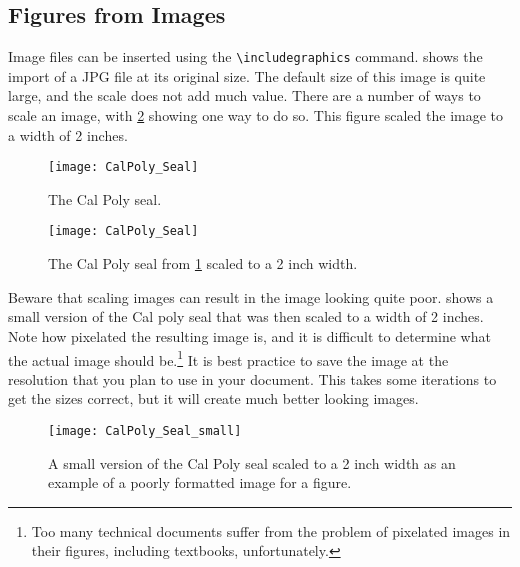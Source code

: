 \subsection{Figures from Images} \label{sec:FiguresFromImages}
    Image files can be inserted using the \lstinline|\includegraphics| command.
     shows the import of a JPG file at its original size.
    The default size of this image is quite large, and the scale does not add much value.
    There are a number of ways to scale an image, with \cref{fig:CalPolySeal_small} showing one way to do so.
    This figure scaled the image to a width of 2 inches.
    \makeatletter
    \@currsize
    \makeatother
    \begin{figure}
        \centering
        \texttt{[image: CalPoly\_Seal]}
        \caption{The Cal Poly seal.}
        \label{fig:CalPolySeal1}
    \end{figure}
    \begin{figure}
        \centering
        \texttt{[image: CalPoly\_Seal]}
        \caption{The Cal Poly seal from \cref{fig:CalPolySeal1} scaled to a 2 inch width.}
        \label{fig:CalPolySeal_small}
    \end{figure}

    Beware that scaling images can result in the image looking quite poor.
     shows a small version of the Cal poly seal that was then scaled to a width of 2 inches.
    Note how pixelated the resulting image is, and it is difficult to determine what the actual image should be.\footnote{Too many technical documents suffer from the problem of pixelated images in their figures, including textbooks, unfortunately.}
    It is best practice to save the image at the resolution that you plan to use in your document.
    This takes some iterations to get the sizes correct, but it will create much better looking images.
    \begin{figure}
        \centering
        \texttt{[image: CalPoly\_Seal\_small]}
        \caption{A small version of the Cal Poly seal scaled to a 2 inch width as an example of a poorly formatted image for a figure.}
        \label{fig:CalPolySeal_scaled}
    \end{figure}

